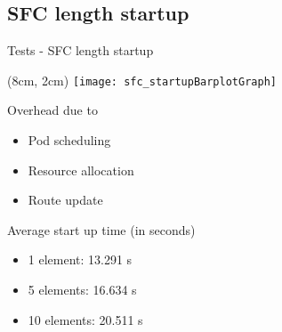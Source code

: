 \subsection{SFC length startup}
\begin{frame}{Tests - SFC length startup}

  \begin{textblock*}{5cm}(8cm, 2cm)
    \texttt{[image: sfc\_startupBarplotGraph]}
  \end{textblock*}

  \vspace*{1cm}

  Overhead due to
  \begin{itemize}
  \item Pod scheduling
  \item Resource allocation
  \item Route update
  \end{itemize}

  \vspace*{1cm}

  Average start up time (in seconds)
  \begin{multicols}{2}
    \begin{itemize}
    \item 1 element: 13.291 s
    \item 5 elements: 16.634 s
    \item 10 elements: 20.511 s
    \end{itemize}
  \end{multicols}

  \vfill
\end{frame}
